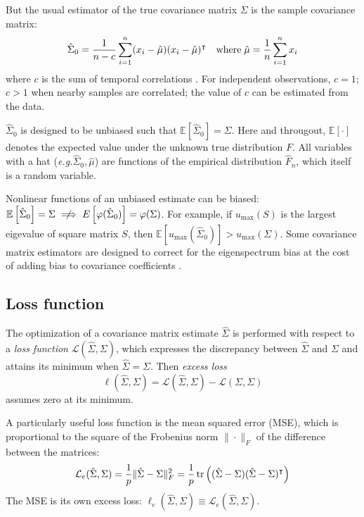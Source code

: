 But the usual estimator of the true covariance matrix $\Sigma$ is  the sample covariance matrix:
\begin{equation}
\hat\Sigma_0 =  \frac 1 {n-c} \sum\limits_{i=1}^n (x_i -\hat\mu) (x_i - \hat\mu)^\intercal
\quad\mbox{where}\;
\hat\mu = \frac 1 n \sum\limits_{i=1}^n x_i
\end{equation}
where $c$ is the sum of temporal correlations . For independent observations, $c=1$;  $c>1$ when nearby samples are correlated; the value of $c$ can be estimated from the data.

$\hat\Sigma_0$ is designed to be unbiased such that $\mathbb E\left[\hat\Sigma_0\right]=\Sigma$.
Here and througout, $\mathbb E[\cdot]$ denotes the expected value under the  unknown true distribution $F$. All variables with a hat (\emph{e.g.}\;$\hat \Sigma_0,\hat \mu$) are functions of the empirical distribution $\hat F_n$, which itself is a random variable.

Nonlinear functions of an unbiased estimate can be biased: $\mathbb E\left[\hat\Sigma_0\right]=\Sigma \centernot\implies  E\left[\varphi(\hat\Sigma_0)\right]=\varphi(\Sigma)$.  For example, if $u_{\max}(S)$ is the largest eigevalue of square matrix $S$, then $\mathbb E\left[u_{\max}(\hat\Sigma_0)\right] > u_{\max}(\Sigma)$. Some covariance matrix estimators are designed to correct for the eigenspectrum bias at the cost of adding bias to covariance coefficients \citep{Ledoit:2004}.




\subsection{Loss function}
The optimization of a covariance matrix estimate $\hat\Sigma$ is performed with respect to a \emph{loss function} $\mathcal L(\hat\Sigma,\Sigma)$, which expresses the discrepancy between $\hat\Sigma$ and $\Sigma$ and attains its minimum when $\hat\Sigma=\Sigma$.  
Then \emph{excess loss}  
\begin{equation}
\ell(\hat\Sigma,\Sigma) = \mathcal L(\hat\Sigma,\Sigma)-\mathcal L(\Sigma,\Sigma)
\end{equation}
assumes zero at its minimum.

A particularly useful loss function is the mean squared error (MSE), which is proportional to the square of the Frobenius  norm $\|\cdot\|_F$ of the difference between the matrices: 
\begin{equation}
\mathcal L_e(\hat\Sigma,\Sigma) =\frac 1 p \|\hat\Sigma-\Sigma\|_F^2 = \frac 1 p \operatorname{tr}\left((\hat \Sigma-\Sigma)(\hat\Sigma-\Sigma)^\intercal\right)
\end{equation}
The MSE is its own excess loss: $\ell_e(\hat\Sigma,\Sigma) \equiv \mathcal L_e(\hat\Sigma,\Sigma)$.

